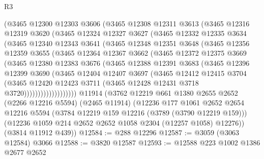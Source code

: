 \begin{lexlean}{R3}
\begin{coremodule}
        (@3465
          @12300
          @12303
          @3606
          (@3465
            @12308
            @12311
            @3613
            (@3465
              @12316
              @12319
              @3620
              (@3465
                @12324
                @12327
                @3627
                (@3465
                  @12332
                  @12335
                  @3634
                  (@3465
                    @12340
                    @12343
                    @3641
                    (@3465
                      @12348
                      @12351
                      @3648
                      (@3465
                        @12356
                        @12359
                        @3655
                        (@3465
                          @12364
                          @12367
                          @3662
                          (@3465
                            @12372
                            @12375
                            @3669
                            (@3465
                              @12380
                              @12383
                              @3676
                              (@3465
                                @12388
                                @12391
                                @3683
                                (@3465
                                  @12396
                                  @12399
                                  @3690
                                  (@3465
                                    @12404
                                    @12407
                                    @3697
                                    (@3465
                                      @12412
                                      @12415
                                      @3704
                                      (@3465
                                        @12420
                                        @12423
                                        @3711
                                        (@3465 @12428 @12431 @3718 @3720)))))))))))))))))))
    @11914
    (@3762
      @12219
      @661
      @1380
      @2655
      @2652
      (@2266 @12216 @5594)
      (@2465 @11914)
      (@12236
        @177
        @1061
        @2652
        @2654
        @12216
        @5594
        (@3784 @12219 @159 @12216 (@3789 (@3790 @12219 @159)))
        (@12236 @1059 @214 @2652 @2652 @1058 @2304 (@12257 @1058) @12276))
      (@3814 @11912 @439))
@12584 := @288 @12296
@12587 := @3059 (@3063 @12584) @3066
@12588 := @3820 @12587
@12593 := @12588 @223 @1002 @1386 @2677 @2652

\end{coremodule}
\end{lexlean}
